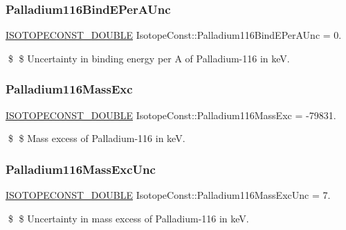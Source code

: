 \subsubsection{\texorpdfstring{Palladium116\+Bind\+E\+Per\+A\+Unc}{Palladium116BindEPerAUnc}}
{\footnotesize\ttfamily \mbox{\hyperlink{group___isotope_const-_macros_ga8f45a7272ce02c0b4c65c44636ed719a}{I\+S\+O\+T\+O\+P\+E\+C\+O\+N\+S\+T\+\_\+\+D\+O\+U\+B\+LE}} Isotope\+Const\+::\+Palladium116\+Bind\+E\+Per\+A\+Unc = 0.}

\$ \$ Uncertainty in binding energy per A of Palladium-\/116 in keV. \mbox{\label{group___isotope_const-_palladium-_pd116_ga8964c06b8b9eaf1f2df69fd48bae2704}} 
\subsubsection{\texorpdfstring{Palladium116\+Mass\+Exc}{Palladium116MassExc}}
{\footnotesize\ttfamily \mbox{\hyperlink{group___isotope_const-_macros_ga8f45a7272ce02c0b4c65c44636ed719a}{I\+S\+O\+T\+O\+P\+E\+C\+O\+N\+S\+T\+\_\+\+D\+O\+U\+B\+LE}} Isotope\+Const\+::\+Palladium116\+Mass\+Exc = -\/79831.}

\$ \$ Mass excess of Palladium-\/116 in keV. \mbox{\label{group___isotope_const-_palladium-_pd116_ga38982b6b2e39bad5017a6817bb9aec9b}} 
\subsubsection{\texorpdfstring{Palladium116\+Mass\+Exc\+Unc}{Palladium116MassExcUnc}}
{\footnotesize\ttfamily \mbox{\hyperlink{group___isotope_const-_macros_ga8f45a7272ce02c0b4c65c44636ed719a}{I\+S\+O\+T\+O\+P\+E\+C\+O\+N\+S\+T\+\_\+\+D\+O\+U\+B\+LE}} Isotope\+Const\+::\+Palladium116\+Mass\+Exc\+Unc = 7.}

\$ \$ Uncertainty in mass excess of Palladium-\/116 in keV. \mbox{\label{group___isotope_const-_palladium-_pd116_ga8946072366c111a6b76eb501748a1e37}} 
